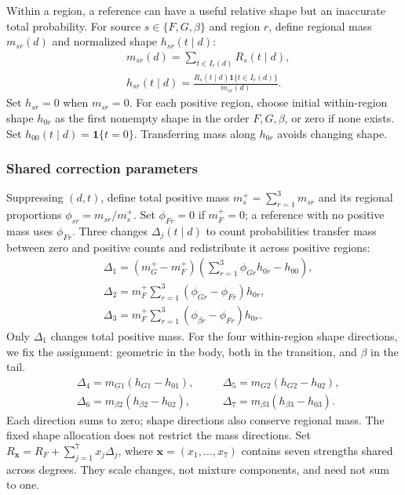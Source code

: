 Within a region, a reference can have a useful relative shape but an inaccurate total probability. For source $s\in\{F,G,\beta\}$ and region $r$, define regional mass $m_{sr}(d)$ and normalized shape $h_{sr}(t\mid d)$:
\begin{equation}
\begin{aligned}
&m_{sr}(d)=\sum_{t\in I_r(d)}R_s(t\mid d),\\
&h_{sr}(t\mid d)=\frac{R_s(t\mid d)\mathbf1\{t\in I_r(d)\}}{m_{sr}(d)}.
\end{aligned}
\label{eq:regional_mass_shape}
\end{equation}
Set $h_{sr}=0$ when $m_{sr}=0$. For each positive region, choose initial within-region shape $h_{0r}$ as the first nonempty shape in the order $F,G,\beta$, or zero if none exists. Set $h_{00}(t\mid d)=\mathbf1\{t=0\}$. Transferring mass along $h_{0r}$ avoids changing shape. %

\subsubsection{Shared correction parameters}
Suppressing $(d,t)$, define total positive mass $m_s^+=\sum_{r=1}^3m_{sr}$ and its regional proportions $\phi_{sr}=m_{sr}/m_s^+$. Set $\phi_{Fr}=0$ if $m_F^+=0$; a reference with no positive mass uses $\phi_{Fr}$. Three changes $\Delta_j(t\mid d)$ to count probabilities transfer mass between zero and positive counts and redistribute it across positive regions:
\begin{equation}
\begin{aligned}
&\Delta_1=(m_G^+-m_F^+)\left(\sum_{r=1}^3\phi_{Gr}h_{0r}-h_{00}\right),\\
&\Delta_2=m_F^+\sum_{r=1}^3(\phi_{Gr}-\phi_{Fr})h_{0r},\\
&\Delta_3=m_F^+\sum_{r=1}^3(\phi_{\beta r}-\phi_{Fr})h_{0r}.
\end{aligned}
\label{eq:structural_directions}
\end{equation}
Only $\Delta_1$ changes total positive mass. For the four within-region shape directions, we fix the assignment: geometric in the body, both in the transition, and $\beta$ in the tail.
\begin{equation}
\begin{alignedat}{2}
&\Delta_4=m_{G1}(h_{G1}-h_{01}), &\quad& \Delta_5=m_{G2}(h_{G2}-h_{02}),\\
&\Delta_6=m_{\beta2}(h_{\beta2}-h_{02}), &\quad& \Delta_7=m_{\beta3}(h_{\beta3}-h_{03}).
\end{alignedat}
\label{eq:structural_shape_directions}
\end{equation}
Each direction sums to zero; shape directions also conserve regional mass. The fixed shape allocation does not restrict the mass directions. Set $R_{\mathbf x}=R_F+\sum_{j=1}^7x_j\Delta_j$, where $\mathbf x=(x_1,\ldots,x_7)$ contains seven strengths shared across degrees. They scale changes, not mixture components, and need not sum to one.


